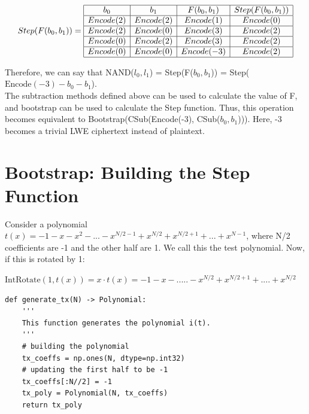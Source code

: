 \documentclass{report}
\begin{document}
\begin{displaymath}
	Step(F(b_0, b_1)) = 
	\begin{array}{|c|c|c|c|}
		\hline
		b_0 & b_1 & F(b_0, b_1) & Step(F(b_0, b_1)) \\ \hline
		Encode(2) & Encode(2) &  Encode(1) & Encode(0) \\ \hline
		Encode(2) & Encode(0) & Encode(3) & Encode(2) \\ \hline
		Encode(0) & Encode(2) & Encode(3) & Encode(2) \\ \hline
		Encode(0) & Encode(0) & Encode(-3)  & Encode(2) \\ \hline
	\end{array}
\end{displaymath}

Therefore, we can say that NAND($l_0, l_1$) = Step(F($b_0, b_1$)) = Step($\text{Encode}(-3) - b_0 - b_1$).\\
The subtraction methods defined above can be used to calculate the value of F, and bootstrap can be used to calculate the Step function. Thus, this operation becomes equivalent to Bootstrap(CSub(Encode(-3), CSub($b_0, b_1$))). Here, -3 becomes a trivial LWE ciphertext instead of plaintext.

\section{Bootstrap: Building the Step Function}
Consider a polynomial $t(x) = -1 - x - x^2 - ... - x^{N/2 - 1} + x^{N/2} + x^{N/2 + 1} + ... + x^{N-1}$, where N/2 coefficients are -1 and the other half are 1. We call this the test polynomial. Now, if this is rotated by 1:
\begin{center}
	$\text{IntRotate}(1, t(x)) = x \cdot t(x) = -1 -x -.....- x^{N/2} + x^{N/2 + 1} + ....+ x^{N/2}$
\end{center}

\begin{verbatim}
def generate_tx(N) -> Polynomial:
	'''
	This function generates the polynomial i(t).
	'''
	# building the polynomial
	tx_coeffs = np.ones(N, dtype=np.int32)
	# updating the first half to be -1
	tx_coeffs[:N//2] = -1
	tx_poly = Polynomial(N, tx_coeffs)
	return tx_poly
\end{verbatim}
\end{document}
